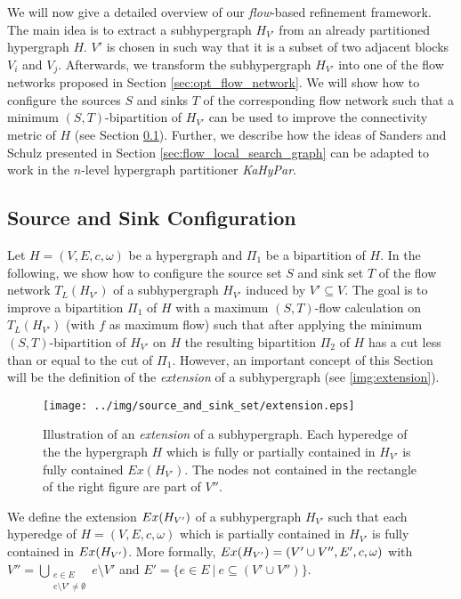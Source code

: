We will now give a detailed overview of our \emph{flow}-based refinement framework. The main
idea is to extract a subhypergraph $H_{V'}$ from an already partitioned hypergraph $H$. 
$V'$ is chosen in such way that it is a subset of two
adjacent blocks $V_i$ and $V_j$. Afterwards, we transform the subhypergraph
$H_{V'}$ into one of the flow networks proposed in Section \ref{sec:opt_flow_network}.
We will show how to configure the sources $S$ and sinks $T$ of the corresponding flow 
network such that a minimum $(S,T)$-bipartition of $H_{V'}$ can be used to improve the connectivity 
metric of $H$ (see Section \ref{sec:source_and_sink}). Further, we describe how 
the ideas of Sanders and Schulz \cite{sanders2011engineering} presented in Section \ref{sec:flow_local_search_graph}
can be adapted to work in the $n$-level hypergraph partitioner \emph{KaHyPar}. 

\subsection{Source and Sink Configuration}
\label{sec:source_and_sink}

Let $H = (V,E,c,\omega)$ be a hypergraph and $\Pi_1$ be a bipartition of $H$.
In the following, we show how to configure the source set $S$ and sink set $T$ of the flow
network $T_L(H_{V'})$ of a subhypergraph $H_{V'}$ induced by $V' \subseteq V$. The goal is 
to improve a bipartition $\Pi_1$ of $H$ with a maximum $(S,T)$-flow calculation 
on $T_L(H_{V'})$ (with $f$ as maximum flow) such that after applying the minimum 
$(S,T)$-bipartition of $H_{V'}$ on $H$ the resulting bipartition $\Pi_2$ of $H$ has a 
cut less than or equal to the cut of $\Pi_1$. However, an important concept of this Section will
be the definition of the \emph{extension} of a subhypergraph (see \autoref{img:extension}).

\begin{figure}
\centering
\texttt{[image: ../img/source\_and\_sink\_set/extension.eps]}
\caption{Illustration of an \emph{extension} of a subhypergraph. Each hyperedge of the
         the hypergraph $H$ which is fully or partially contained in $H_{V'}$ is fully
         contained $Ex(H_{V'})$. The nodes not contained in the rectangle of the right figure
         are part of $V''$.}
\label{img:extension}
\end{figure}

\begin{definition}
\label{def:sub_extension}
We define the extension $Ex(H_{V'})$ of a subhypergraph $H_{V'}$ such that each hyperedge of $H = (V,E,c,\omega)$ which is
partially contained in $H_{V'}$ is fully contained in $Ex(H_{V'})$. More formally,
$Ex(H_{V'}) = (V' \cup V'', E', c, \omega)$ with $V'' = \bigcup_{\substack{e \in E \\ e \setminus V' \neq \emptyset}} e \setminus V'$
and $E' = \{e \in E\ |\ e \subseteq (V' \cup V'')\}$.
\end{definition}

